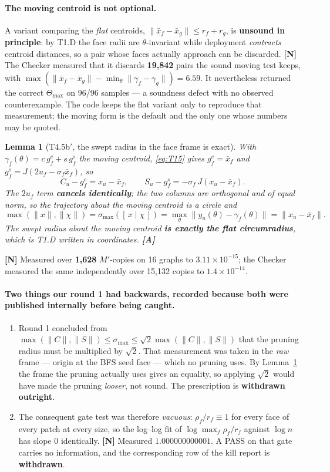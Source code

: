 \documentclass[11pt,a4paper]{article}
\newtheorem{lemma}[theorem]{Lemma}
\theoremstyle{definition}
\newcommand{\Tmax}{\Theta_{\max}}
\newcommand{\Mprime}{M'}
\begin{document}
\paragraph{The moving centroid is not optional.} A variant comparing the \emph{flat}
centroids, $\|\bar{x}_f-\bar{x}_g\|\le r_f+r_g$, is \textbf{unsound in principle}: by T1.D
the face radii are $\theta$-invariant while deployment \emph{contracts} centroid distances,
so a pair whose faces actually approach can be discarded. \textbf{[N]} The Checker measured
that it discards \textbf{19{,}842} pairs the sound moving test keeps, with
$\max(\|\bar{x}_f-\bar{x}_g\|-\min_\theta\|\gamma_f-\gamma_g\|)=6.59$. It nevertheless
returned the correct $\Tmax$ on 96/96 samples --- a soundness defect with no observed
counterexample. The code keeps the flat variant only to reproduce that measurement; the
moving form is the default and the only one whose numbers may be quoted.

\begin{lemma}[T4.5b$'$, the swept radius in the face frame is exact]
\label{lem:swept}
With $\gamma_f(\theta)=c\,g^c_f+s\,g^s_f$ the moving centroid, \eqref{eq:T15} gives
$g^c_f=\bar{x}_f$ and $g^s_f=J(2u_f-\sigma_f\bar{x}_f)$, so
\[
C_u-g^c_f = x_u-\bar{x}_f, \qquad
S_u-g^s_f = -\sigma_f\,J(x_u-\bar{x}_f).
\]
The $2u_f$ term \textbf{cancels identically}; the two columns are orthogonal and of equal
norm, so the trajectory about the moving centroid is a \emph{circle} and
\[
\max(\|x\|,\|\chi\|) = \sigma_{\max}([\,x\mid\chi\,]) = \max_\theta\|y_u(\theta)-\gamma_f(\theta)\|
= \|x_u-\bar{x}_f\| .
\]
The swept radius about the moving centroid \textbf{is exactly the flat circumradius}, which
is T1.D written in coordinates. \textbf{[A]}
\end{lemma}
\noindent\textbf{[N]} Measured over \textbf{1{,}628} $\Mprime$-copies on 16 graphs to
$3.11\times10^{-15}$; the Checker measured the same independently over 15{,}132 copies to
$1.4\times10^{-14}$.

\paragraph{Two things our round 1 had backwards, recorded because both were published
internally before being caught.}
\begin{enumerate}\itemsep2pt
\item Round 1 concluded from $\max(\|C\|,\|S\|)\le\sigma_{\max}\le\sqrt2\max(\|C\|,\|S\|)$
that the pruning radius must be multiplied by $\sqrt2$. That measurement was taken in the
\emph{raw} frame --- origin at the BFS seed face --- which no pruning uses. By
Lemma~\ref{lem:swept} the frame the pruning actually uses gives an equality, so applying
$\sqrt2$ would have made the pruning \emph{looser}, not sound. The prescription is
\textbf{withdrawn outright}.
\item The consequent gate test was therefore \emph{vacuous}: $\rho_f/r_f\equiv1$ for every
face of every patch at every size, so the log--log fit of $\log\max_f\rho_f/r_f$ against
$\log n$ has slope 0 identically. \textbf{[N]} Measured $1.000000000001$. A PASS on that gate
carries no information, and the corresponding row of the kill report is
\textbf{withdrawn}.
\end{enumerate}
\end{document}

